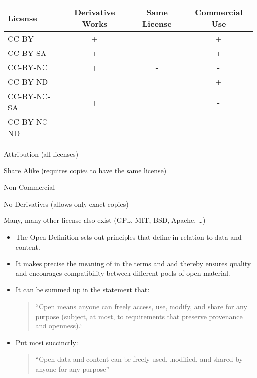 \documentclass[a4paper,landscape,headrule,footrule,xetex]{foils}
\begin{document}
\medskip
\begin{tabular}{lccc}
  License       & Derivative Works & Same License & Commercial Use \\
\hline
  CC-BY         &   + &  - &  + \\
  CC-BY-SA      &   + &  + &  + \\  
  CC-BY-NC      &   + &  - &  - \\
  CC-BY-ND      &   - &  - &  + \\
  CC-BY-NC-SA   &   + &  + &  - \\
  CC-BY-NC-ND   &   - &  - &  - \\
\end{tabular}
\begin{description} \addtolength{\itemsep}{-0.5\itemsep}
\item[BY] Attribution (all licenses)
\item[SA] Share Alike (requires copies to have the same license)
\item[NC] Non-Commercial
\item[ND] No Derivatives (allows only exact copies) 
\end{description}

Many, many other license also exist (GPL, MIT, BSD, Apache, \ldots)

 \begin{itemize}
 \item The Open Definition sets out principles that define 
   in relation to data and content.
 \item It makes precise the meaning of  in the terms 
   and  and thereby ensures quality and encourages
   compatibility between different pools of open material.
 \item It can be summed up in the statement that:
   \begin{quote}
     “Open means anyone can freely access, use, modify, and share for
     any purpose (subject, at most, to requirements that preserve
     provenance and openness).”
   \end{quote}
 \item Put most succinctly:
   \begin{quote}
     “Open data and content can be freely used, modified, and shared
     by anyone for any purpose”
   \end{quote}
 \end{itemize}
\end{document}
